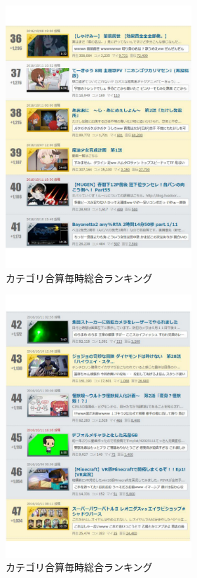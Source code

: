 \begin{figure}[htb]
\centering
\includegraphics[width=7cm]{r07.pdf}
\caption{カテゴリ合算毎時総合ランキング}\label{aba}
\end{figure}

\begin{figure}[htb]
\centering
\includegraphics[width=7cm]{r08.pdf}
\caption{カテゴリ合算毎時総合ランキング}\label{abb}
\end{figure}

